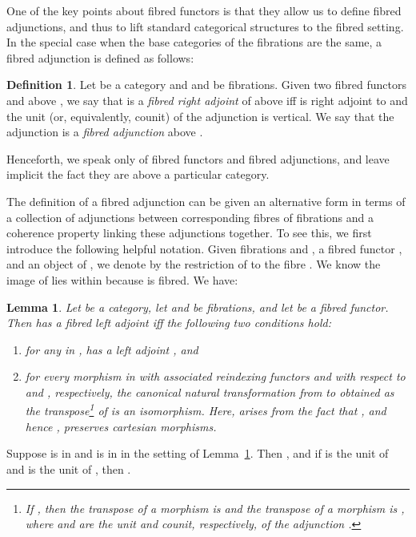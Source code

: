 \documentclass{LMCS}
\theoremstyle{plain}
\newtheorem{lemma}[theorem]{Lemma}
\theoremstyle{remark}
\theoremstyle{definition}
\newtheorem{definition}[theorem]{Definition}
\begin{document}
One of the key points about fibred functors is that they allow us to
define fibred adjunctions, and thus to lift standard categorical
structures to the fibred setting. In the special case when the base
categories of the fibrations are the same, a fibred adjunction is
defined as follows:

\begin{definition}
  Let  be a category and  and  be
  fibrations. Given two fibred functors  and 
  above , we say that  is a {\em fibred right adjoint} of 
  above  iff  is right adjoint to  and the unit (or,
  equivalently, counit) of the adjunction  is vertical.  We
  say that the adjunction  is a {\em fibred adjunction}
  above .
\end{definition}
\noindent
Henceforth, we speak only of fibred functors and fibred adjunctions,
and leave implicit the fact they are above a particular category. 

The definition of a fibred adjunction can be given an alternative form
in terms of a collection of adjunctions between corresponding fibres
of fibrations and a coherence property linking these adjunctions
together. To see this, we first introduce the following helpful
notation.  Given fibrations  and , a
fibred functor , and an object  of , we denote by
 the restriction of  to the fibre . We
know the image of  lies within  because  is fibred. We
have:

\begin{lemma}\label{lem:fibadj}
  Let  be a category, let  and  be
  fibrations, and let  be a fibred functor. Then  has a
  fibred left adjoint iff the following two conditions hold:
\begin{enumerate}[\em(1)]
\item for any  in ,  has a left adjoint , and
\item for every morphism  in  with associated reindexing
  functors  and  with respect to and ,
  respectively, the canonical natural transformation from
   to  obtained as the transpose\footnote{If
    , then the transpose of a morphism
     is  and the transpose of a
    morphism  is , where  and  are
    the unit and counit, respectively, of the adjunction .} of  is an isomorphism. Here,  arises from the fact that
  , and hence , preserves cartesian morphisms.
\end{enumerate}
\end{lemma}

\noindent
Suppose  is in  and  is in  in the setting of
Lemma~\ref{lem:fibadj}. Then , and if  is the unit of
 and  is the unit of , then
.
\end{document}
